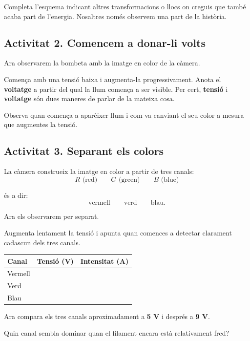 Completa l'esquema indicant altres transformacions o llocs on creguis que també acaba part de l'energia. Nosaltres només observem una part de la història.


\subsection{Activitat 2. Comencem a donar-li volts}

Ara observarem la bombeta amb la imatge en color de la càmera.

Comença amb una tensió baixa i augmenta-la progressivament. Anota el \textbf{voltatge} a partir del qual la llum comença a ser visible. Per cert, \textbf{tensió} i \textbf{voltatge} són dues maneres de parlar de la mateixa cosa.

Observa quan comença a aparèixer llum i com va canviant el seu color a mesura que augmentes la tensió.

\subsection{Activitat 3. Separant els colors}

La càmera construeix la imatge en color a partir de tres canals:
\[
R \text{ (red)} \qquad G \text{ (green)} \qquad B \text{ (blue)}
\]

és a dir:
\[
\text{vermell} \qquad
\text{verd} \qquad
\text{blau}.
\]

Ara els observarem per separat.

Augmenta lentament la tensió i apunta quan comences a detectar clarament cadascun dels tres canals.
\begin{center}
\renewcommand{\arraystretch}{1.6}
\begin{tabularx}{\linewidth}{|X|
                                >{\centering\arraybackslash}X|
                                >{\centering\arraybackslash}X|}
\hline
\textbf{Canal} &
\textbf{Tensió (V)} &
\textbf{Intensitat (A)} \\
\hline
Vermell & & \\ \hline
Verd    & & \\ \hline
Blau    & & \\ \hline
\end{tabularx}
\end{center}

Ara compara els tres canals aproximadament a \textbf{5 V} i després a \textbf{9 V}.

Quin canal sembla dominar quan el filament encara està relativament fred?

